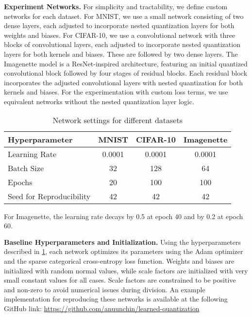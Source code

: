 \textbf{Experiment Networks.} 
For simplicity and tractability, we define custom networks for each dataset.
For MNIST, we use a small network consisting of two dense layers, 
each adjusted to incorporate nested quantization layers for both weights and biases. 
For CIFAR-10, we use a convolutional network with three blocks of convolutional layers, 
each adjusted to incorporate nested quantization layers for both kernels and biases.
These are followed by two dense layers.
The Imagenette model is a ResNet-inspired architecture,
featuring an initial quantized convolutional block followed by four stages of residual blocks. 
Each residual block incorporates the adjusted convolutional layers with nested quantization 
for both kernels and biases. For the experimentation with custom loss terms, 
we use equivalent networks without the nested quantization layer logic.
\begin{table}[b!]
  \centering
  \caption{Network settings for different datasets}
  \label{tab:hyperparameters}
  \begin{tabular}{lccc}
      \toprule
      \textbf{Hyperparameter}     & \textbf{MNIST} & \textbf{CIFAR-10} & \textbf{Imagenette} \\ 
      \midrule
      Learning Rate               & 0.0001            & 0.0001              & 0.0001\footnotemark[1]           \\ 
      Batch Size                  & 32                & 128                 & 64                 \\ 
      Epochs                      & 20               & 100                 & 100                \\ 
      Seed for Reproducibility   & 42               & 42                  & 42                \\ 
      \bottomrule
  \end{tabular}
  \vspace{1.0em}
  \begin{center}
    \parbox{0.86\textwidth}{\footnotesize\footnotemark[1] For Imagenette, the learning rate decays by 0.5 at epoch 40 and by 0.2 at epoch 60.}
  \end{center}
\end{table}


\textbf{Baseline Hyperparameters and Initialization.} Using the hyperparameters described in \cref{tab:hyperparameters}, 
each network optimizes its parameters using the Adam optimizer and the sparse categorical cross-entropy loss function. 
Weights and biases are initialized with random normal values, 
while scale factors are initialized with very small constant values for all cases. 
Scale factors are constrained to be positive and non-zero to avoid numerical issues during division. 
An example implementation for reproducing these networks is available at the following GitHub link: \url{https://github.com/anuunchin/learned-quantization}


